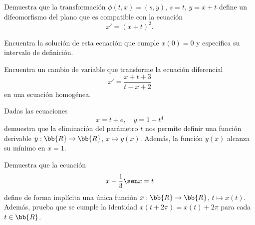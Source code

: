 \documentclass[12pt]{article}
\begin{document}
\begin{ejercicio}
    Demuestra que la transformación \(\phi(t, x) = (s, y)\), \(s = t\), \(y = x + t\) define un difeomorfismo del plano que es compatible con la ecuación
    \[
        x' = (x + t)^2.
    \]

    Encuentra la solución de esta ecuación que cumple \(x(0) = 0\) y especifica su intervalo de definición.
\end{ejercicio}

\begin{ejercicio}
    Encuentra un cambio de variable que transforme la ecuación diferencial
    \[
        x' = \dfrac{x + t + 3}{t - x + 2}
    \]
    en una ecuación homogénea.
\end{ejercicio}

\begin{ejercicio}
    Dadas las ecuaciones
    \[
        x = t + e, \quad y = 1 + t^4
    \]
    demuestra que la eliminación del parámetro \(t\) nos permite definir una función derivable \(y : \bb{R} \to \bb{R}\), \(x \mapsto y(x)\). Además, la función \(y(x)\) alcanza su mínimo en \(x = 1\).
\end{ejercicio}



\begin{ejercicio}
    Demuestra que la ecuación
    \[
        x - \dfrac{1}{3} \sen x = t
    \]
    define de forma implícita una única función \(x : \bb{R} \to \bb{R}\), \(t \mapsto x(t)\). Además, prueba que se cumple la identidad \(x(t + 2\pi) = x(t) + 2\pi\) para cada \(t \in \bb{R}\).
\end{ejercicio}
\end{document}
